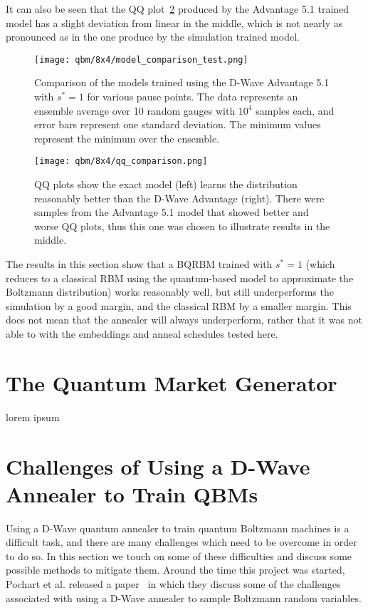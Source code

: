 It can also be seen that the QQ plot~\cref{fig:qq_comparison} produced by the Advantage 5.1 trained model has a slight deviation from linear in the middle, which is not nearly as pronounced as in the one produce by the simulation trained model.
\begin{figure}[!htb]
    \begin{center}
        \texttt{[image: qbm/8x4/model\_comparison\_test.png]}
    \end{center}
    \caption{Comparison of the models trained using the D-Wave Advantage 5.1 with \( s^* = 1 \) for various pause points. The data represents an ensemble average over 10 random gauges with \( 10^4 \) samples each, and error bars represent one standard deviation. The minimum values represent the minimum over the ensemble.}
    \label{fig:model_comparison_test}
\end{figure}
\begin{figure}[!htb]
    \begin{center}
        \texttt{[image: qbm/8x4/qq\_comparison.png]}
    \end{center}
    \caption{QQ plots show the exact model (left) learns the distribution reasonably better than the D-Wave Advantage (right). There were samples from the Advantage 5.1 model that showed better and worse QQ plots, thus this one was chosen to illustrate results in the middle.}
    \label{fig:qq_comparison}
\end{figure}

The results in this section show that a BQRBM trained with \( s^* = 1 \) (which reduces to a classical RBM using the quantum-based model to approximate the Boltzmann distribution) works reasonably well, but still underperforms the simulation by a good margin, and the classical RBM by a smaller margin.
This does not mean that the annealer will always underperform, rather that it was not able to with the embeddings and anneal schedules tested here.

\section{The Quantum Market Generator}
lorem ipsum

\section{Challenges of Using a D-Wave Annealer to Train QBMs}
Using a D-Wave quantum annealer to train quantum Boltzmann machines is a difficult task, and there are many challenges which need to be overcome in order to do so.
In this section we touch on some of these difficulties and discuss some possible methods to mitigate them.
Around the time this project was started, Pochart et al. released a paper~\cite{pochart_2021} in which they discuss some of the challenges associated with using a D-Wave annealer to sample Boltzmann random variables.

